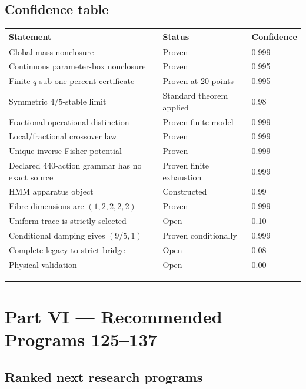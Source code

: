 \documentclass[11pt,a4paper,openany]{report}
\begin{document}
\section{Confidence table}

\begin{center}
\begingroup\small
\setlength{\tabcolsep}{3.5pt}
\renewcommand{\arraystretch}{1.16}
\begin{longtable}{@{}p{}p{}p{}@{}}
\toprule
\textbf{Statement} & \textbf{Status} & \textbf{Confidence} \\
\midrule
\endhead
Global mass nonclosure & Proven & 0.999 \\
Continuous parameter-box nonclosure & Proven & 0.995 \\
Finite-\(q\) sub-one-percent certificate & Proven at 20 points & 0.995 \\
Symmetric \(4/5\)-stable limit & Standard theorem applied & 0.98 \\
Fractional operational distinction & Proven finite model & 0.999 \\
Local/\allowbreak{}fractional crossover law & Proven & 0.999 \\
Unique inverse Fisher potential & Proven & 0.999 \\
Declared 440-action grammar has no exact source & Proven finite exhaustion & 0.999 \\
HMM apparatus object & Constructed & 0.99 \\
Fibre dimensions are \((1,2,2,2,2)\) & Proven & 0.999 \\
Uniform trace is strictly selected & Open & 0.10 \\
Conditional damping gives \((9/5,1)\) & Proven conditionally & 0.999 \\
Complete legacy-to-strict bridge & Open & 0.08 \\
Physical validation & Open & 0.00 \\
\bottomrule
\end{longtable}
\endgroup
\end{center}

\par\medskip\hrule\medskip

\chapter{Part VI --- Recommended Programs 125--137}

\section{Ranked next research programs}
\end{document}
